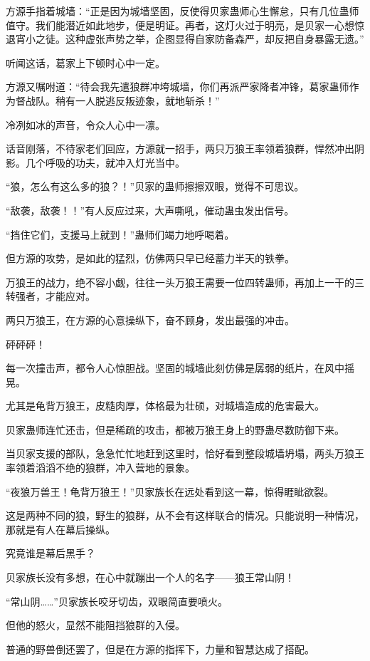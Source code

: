 \begin{this_body}
方源手指着城墙：“正是因为城墙坚固，反使得贝家蛊师心生懈怠，只有几位蛊师值守。我们能潜近如此地步，便是明证。再者，这灯火过于明亮，是贝家一心想惊退宵小之徒。这种虚张声势之举，企图显得自家防备森严，却反把自身暴露无遗。”

听闻这话，葛家上下顿时心中一定。

方源又嘱咐道：“待会我先遣狼群冲垮城墙，你们再派严家降者冲锋，葛家蛊师作为督战队。稍有一人脱逃反叛迹象，就地斩杀！”

冷冽如冰的声音，令众人心中一凛。

话音刚落，不待家老们回应，方源就一招手，两只万狼王率领着狼群，悍然冲出阴影。几个呼吸的功夫，就冲入灯光当中。

“狼，怎么有这么多的狼？！”贝家的蛊师擦擦双眼，觉得不可思议。

“敌袭，敌袭！！”有人反应过来，大声嘶吼，催动蛊虫发出信号。

“挡住它们，支援马上就到！”蛊师们竭力地呼喝着。

但方源的攻势，是如此的猛烈，仿佛两只早已经蓄力半天的铁拳。

万狼王的战力，绝不容小觑，往往一头万狼王需要一位四转蛊师，再加上一干的三转强者，才能应对。

两只万狼王，在方源的心意操纵下，奋不顾身，发出最强的冲击。

砰砰砰！

每一次撞击声，都令人心惊胆战。坚固的城墙此刻仿佛是孱弱的纸片，在风中摇晃。

尤其是龟背万狼王，皮糙肉厚，体格最为壮硕，对城墙造成的危害最大。

贝家蛊师连忙还击，但是稀疏的攻击，都被万狼王身上的野蛊尽数防御下来。

当贝家支援的部队，急急忙忙地赶到这里时，恰好看到整段城墙坍塌，两头万狼王率领着滔滔不绝的狼群，冲入营地的景象。

“夜狼万兽王！龟背万狼王！”贝家族长在远处看到这一幕，惊得睚眦欲裂。

这是两种不同的狼，野生的狼群，从不会有这样联合的情况。只能说明一种情况，那就是有人在幕后操纵。

究竟谁是幕后黑手？

贝家族长没有多想，在心中就蹦出一个人的名字——狼王常山阴！

“常山阴……”贝家族长咬牙切齿，双眼简直要喷火。

但他的怒火，显然不能阻挡狼群的入侵。

普通的野兽倒还罢了，但是在方源的指挥下，力量和智慧达成了搭配。


\end{this_body}
